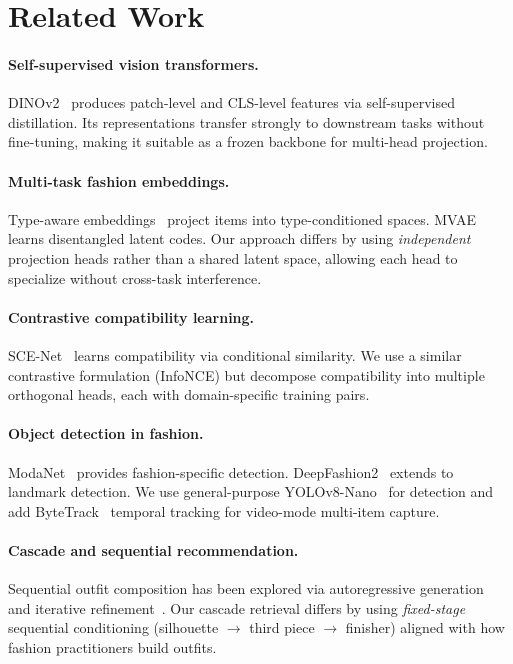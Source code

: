 \documentclass[10pt,twocolumn]{article}
\begin{document}
\section{Related Work}
\label{sec:related}

\paragraph{Self-supervised vision transformers.}
DINOv2~\citep{oquab2024dinov2} produces patch-level and CLS-level features
via self-supervised distillation.  Its representations transfer strongly to
downstream tasks without fine-tuning, making it suitable as a frozen
backbone for multi-head projection.

\paragraph{Multi-task fashion embeddings.}
Type-aware embeddings~\citep{vasileva2018learning} project items into
type-conditioned spaces.  MVAE~\citep{han2019mvae} learns disentangled
latent codes.  Our approach differs by using \emph{independent} projection
heads rather than a shared latent space, allowing each head to specialize
without cross-task interference.

\paragraph{Contrastive compatibility learning.}
SCE-Net~\citep{tan2019scenet} learns compatibility via conditional
similarity.  We use a similar contrastive formulation (InfoNCE) but
decompose compatibility into multiple orthogonal heads, each with
domain-specific training pairs.

\paragraph{Object detection in fashion.}
ModaNet~\citep{zheng2018modanet} provides fashion-specific detection.
DeepFashion2~\citep{ge2019deepfashion2} extends to landmark detection.
We use general-purpose YOLOv8-Nano~\citep{jocher2023ultralytics} for
detection and add ByteTrack~\citep{zhang2022bytetrack} temporal tracking
for video-mode multi-item capture.

\paragraph{Cascade and sequential recommendation.}
Sequential outfit composition has been explored via
autoregressive generation~\citep{chen2019pog} and iterative
refinement~\citep{lin2020csanet}.  Our cascade retrieval differs by using
\emph{fixed-stage} sequential conditioning (silhouette $\to$ third piece
$\to$ finisher) aligned with how fashion practitioners build outfits.
\end{document}

